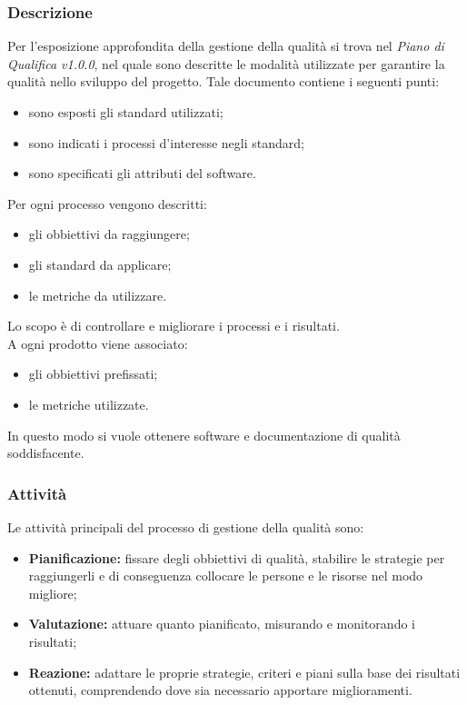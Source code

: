         \subsubsection{Descrizione}
        Per l'esposizione approfondita della gestione della qualità si trova nel \emph{Piano di Qualifica v1.0.0}, nel quale sono descritte le modalità utilizzate per garantire la qualità nello sviluppo del progetto. Tale documento contiene i seguenti punti:
        \begin{itemize}
            \item sono esposti gli standard utilizzati;
            \item sono indicati i processi d'interesse negli standard;
            \item sono specificati gli attributi del software.
        \end{itemize}
        Per ogni processo vengono descritti:
        \begin{itemize}
            \item gli obbiettivi da raggiungere;
            \item gli standard da applicare;
            \item le metriche da utilizzare.
        \end{itemize}
        Lo scopo è di controllare e migliorare i processi e i risultati. \\
        A ogni prodotto viene associato:
        \begin{itemize}
            \item gli obbiettivi prefissati;
            \item le metriche utilizzate.
        \end{itemize} 
        In questo modo si vuole ottenere software e documentazione di qualità soddisfacente.
        \subsubsection{Attività}
        Le attività principali del processo di gestione della qualità sono:
        \begin{itemize}
            \item \textbf{Pianificazione:} fissare degli obbiettivi di qualità, stabilire le strategie per raggiungerli e di conseguenza collocare le persone e le risorse nel modo migliore;
            \item \textbf{Valutazione:} attuare quanto pianificato, misurando e monitorando i risultati;
            \item \textbf{Reazione:} adattare le proprie strategie, criteri e piani sulla base dei risultati ottenuti, comprendendo dove sia necessario apportare miglioramenti.
        \end{itemize}
